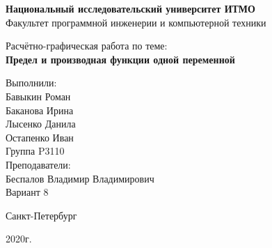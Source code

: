 \thispagestyle{empty}
\begin{center}
    {\bfseries Национальный исследовательский университет ИТМО}\\
    Факультет программной инженерии и компьютерной техники

    \vspace{20em}

    {\large Расчётно-графическая работа по теме:}\\
    {\Large \textbf{Предел и производная функции одной переменной}}
\end{center}

\vspace{10em}

\begin{flushright}
    Выполнили:\\
    Бавыкин Роман\\
    Баканова Ирина\\
    Лысенко Данила\\
    Остапенко Иван\\
    Группа P3110\\
    Преподаватели:\\
    Беспалов Владимир Владимирович\\
    Вариант 8
\end{flushright}

\vspace{\fill}

\begin{center}
Санкт-Петербург

2020г.
\end{center}
\newpage
